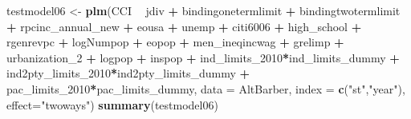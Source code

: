\documentclass[]{article}
\newenvironment{Shaded}{\begin{snugshade}}{\end{snugshade}}
\newcommand{\KeywordTok}[1]{\textcolor[rgb]{0.13,0.29,0.53}{\textbf{#1}}}
\newcommand{\DataTypeTok}[1]{\textcolor[rgb]{0.13,0.29,0.53}{#1}}
\newcommand{\DecValTok}[1]{\textcolor[rgb]{0.00,0.00,0.81}{#1}}
\newcommand{\StringTok}[1]{\textcolor[rgb]{0.31,0.60,0.02}{#1}}
\newcommand{\OperatorTok}[1]{\textcolor[rgb]{0.81,0.36,0.00}{\textbf{#1}}}
\newcommand{\NormalTok}[1]{#1}
\begin{document}
\begin{Shaded}
\begin{Highlighting}[]
\NormalTok{testmodel06 <-}\StringTok{ }\KeywordTok{plm}\NormalTok{(CCI }\OperatorTok{~}\StringTok{ }\NormalTok{jdiv }\OperatorTok{+}\StringTok{ }\NormalTok{bindingonetermlimit }\OperatorTok{+}\StringTok{ }\NormalTok{bindingtwotermlimit }\OperatorTok{+}\StringTok{ }\NormalTok{rpcinc_annual_new }\OperatorTok{+}\StringTok{ }\NormalTok{eousa }\OperatorTok{+}\StringTok{ }\NormalTok{unemp }\OperatorTok{+}\StringTok{ }\NormalTok{citi6006 }\OperatorTok{+}\StringTok{ }\NormalTok{high_school }\OperatorTok{+}\StringTok{ }\NormalTok{rgenrevpc }\OperatorTok{+}\StringTok{ }\NormalTok{logNumpop }\OperatorTok{+}\StringTok{ }\NormalTok{eopop }\OperatorTok{+}\StringTok{ }\NormalTok{men_ineqincwag }\OperatorTok{+}\StringTok{ }\NormalTok{grelimp }\OperatorTok{+}\StringTok{ }\NormalTok{urbanization_}\DecValTok{2} \OperatorTok{+}\StringTok{ }\NormalTok{logpop }\OperatorTok{+}\StringTok{ }\NormalTok{inspop }\OperatorTok{+}\StringTok{ }\NormalTok{ind_limits_}\DecValTok{2010}\OperatorTok{*}\NormalTok{ind_limits_dummy }\OperatorTok{+}\StringTok{ }\NormalTok{ind2pty_limits_}\DecValTok{2010}\OperatorTok{*}\NormalTok{ind2pty_limits_dummy }\OperatorTok{+}\StringTok{ }\NormalTok{pac_limits_}\DecValTok{2010}\OperatorTok{*}\NormalTok{pac_limits_dummy, }\DataTypeTok{data =}\NormalTok{ AltBarber, }\DataTypeTok{index =} \KeywordTok{c}\NormalTok{(}\StringTok{"st"}\NormalTok{,}\StringTok{"year"}\NormalTok{), }\DataTypeTok{effect=}\StringTok{"twoways"}\NormalTok{)}
\KeywordTok{summary}\NormalTok{(testmodel06)}
\end{Highlighting}
\end{Shaded}
\end{document}
